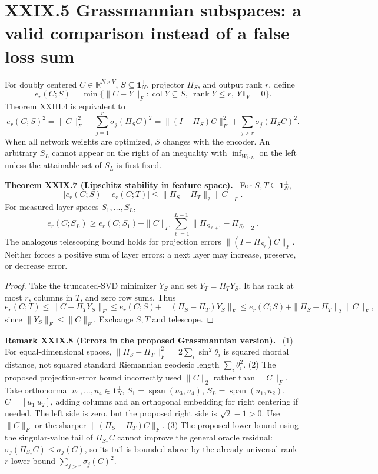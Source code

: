 \documentclass[11pt,a4paper,oneside]{book}
\newcommand{\R}{\mathbb R}\newcommand{\C}{\mathbb C}\newcommand{\Z}{\mathbb Z}\newcommand{\N}{\mathbb N}\newcommand{\Q}{\mathbb Q}
\newcommand{\one}{\mathbf 1}\newcommand{\ii}{\mathrm i}\newcommand{\dd}{\mathrm d}
\DeclareMathOperator{\rank}{rank}\DeclareMathOperator{\Tr}{Tr}
\newcommand{\statement}[3]{\par\medskip\noindent\textbf{#1 #2 (#3).}\ }
\begin{document}
\section*{XXIX.5 Grassmannian subspaces: a valid comparison instead of a false loss sum}
For doubly centered $C\in\R^{N\times V}$, $S\subseteq\one_N^\perp$, projector $\Pi_S$, and output rank $r$, define
\[e_r(C;S)=\min\{\|C-Y\|_F:\operatorname{col}Y\subseteq S,\ \rank Y\le r,\ Y\one_V=0\}.\]
Theorem XXIII.4 is equivalent to
\begin{equation}e_r(C;S)^2=\|C\|_F^2-\sum_{j=1}^r\sigma_j(\Pi_SC)^2=\|(I-\Pi_S)C\|_F^2+\sum_{j>r}\sigma_j(\Pi_SC)^2.\tag{111}\end{equation}
When all network weights are optimized, $S$ changes with the encoder. An arbitrary $S_L$ cannot appear on the right of an inequality with $\inf_{W_{1:L}}$ on the left unless the attainable set of $S_L$ is first fixed.
\statement{Theorem}{XXIX.7}{Lipschitz stability in feature space} For $S,T\subseteq\one_N^\perp$,
\[|e_r(C;S)-e_r(C;T)|\le\|\Pi_S-\Pi_T\|_2\|C\|_F.\]
For measured layer spaces $S_1,\ldots,S_L$,
\[e_r(C;S_L)\ge e_r(C;S_1)-\|C\|_F\sum_{\ell=1}^{L-1}\|\Pi_{S_{\ell+1}}-\Pi_{S_\ell}\|_2.\]
The analogous telescoping bound holds for projection errors $\|(I-\Pi_{S_\ell})C\|_F$. Neither forces a positive sum of layer errors: a next layer may increase, preserve, or decrease error.
\begin{proof}Take the truncated-SVD minimizer $Y_S$ and set $Y_T=\Pi_TY_S$. It has rank at most $r$, columns in $T$, and zero row sums. Thus
\[e_r(C;T)\le\|C-\Pi_TY_S\|_F\le e_r(C;S)+\|(\Pi_S-\Pi_T)Y_S\|_F\le e_r(C;S)+\|\Pi_S-\Pi_T\|_2\|C\|_F,\]
since $\|Y_S\|_F\le\|C\|_F$. Exchange $S,T$ and telescope.\end{proof}
\statement{Remark}{XXIX.8}{Errors in the proposed Grassmannian version} (1) For equal-dimensional spaces, $\|\Pi_S-\Pi_T\|_F^2=2\sum_i\sin^2\theta_i$ is squared chordal distance, not squared standard Riemannian geodesic length $\sum_i\theta_i^2$. (2) The proposed projection-error bound incorrectly used $\|C\|_2$ rather than $\|C\|_F$. Take orthonormal $u_1,\ldots,u_4\in\one_N^\perp$, $S_1=\operatorname{span}(u_3,u_4)$, $S_L=\operatorname{span}(u_1,u_2)$, $C=[u_1\ u_2]$, adding columns and an orthogonal embedding for right centering if needed. The left side is zero, but the proposed right side is $\sqrt2-1>0$. Use $\|C\|_F$ or the sharper $\|(\Pi_S-\Pi_T)C\|_F$. (3) The proposed lower bound using the singular-value tail of $\Pi_{S_*}C$ cannot improve the general oracle residual: $\sigma_j(\Pi_{S_*}C)\le\sigma_j(C)$, so its tail is bounded above by the already universal rank-$r$ lower bound $\sum_{j>r}\sigma_j(C)^2$.
\end{document}
